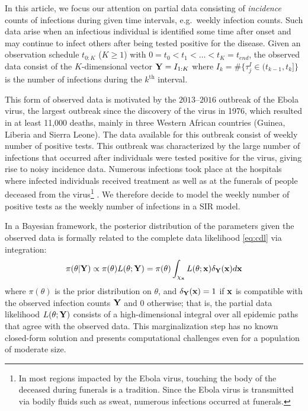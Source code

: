 \documentclass[11pt]{article}
\begin{document}
	In this article, we focus our attention on partial data consisting of \textit{incidence} counts of infections during given time intervals, e.g.\ weekly infection counts. Such data arise when an infectious individual is identified some time after onset and may continue to infect others after being tested positive for the disease. Given an observation schedule $t_{0:K}$ ($K \ge 1$) with $0 = t_0 < t_1 < \dots < t_K = t_{end}$, the observed data consist of the $K$-dimensional vector $\mathbf{Y} = I_{1:K}$ where $I_k = \#\{\tau^I_j \in (t_{k-1}, t_k]\}$ is the number of infections during the $k^{\text{th}}$ interval.
	
	This form of observed data is motivated by the $2013$–$2016$ outbreak of the Ebola virus, the largest outbreak since the discovery of the virus in 1976, which resulted in at least 11,000 deaths, mainly in three Western African countries (Guinea, Liberia and Sierra Leone). The data available for this outbreak consist of weekly number of positive tests. This outbreak was characterized by the large number of infections that occurred after individuals were tested positive for the virus, giving rise to noisy incidence data. Numerous infections took place at the hospitals where infected individuals received treatment as well as at the funerals of people deceased from the virus\footnote{In most regions impacted by the Ebola virus, touching the body of the deceased during funerals is a tradition. Since the Ebola virus is transmitted via bodily fluids such as sweat, numerous infections occurred at funerals.} \cite{Coltart.2017}. We therefore decide to model the weekly number of positive tests as the weekly number of infections in a SIR model.
	
	
	In a Bayesian framework, the posterior distribution of the parameters given the observed data is formally related to the complete data likelihood \eqref{eq:cdl} via integration:
	\begin{equation}
		\label{eq:pdl}
		\pi(\theta|\mathbf{Y}) 
		\propto \pi(\theta) L(\theta; \mathbf{Y}) = \pi(\theta) \int_{\chi_{\mathbf{x}}} L(\theta; \mathbf{x}) \delta_{\mathbf{Y}}(\mathbf{x}) d\mathbf{x}
	\end{equation}
	where $\pi(\theta)$ is the prior distribution on $\theta$, and
	$\delta_{\mathbf{Y}}(\mathbf{x}) = 1$ if $\mathbf{x}$ is compatible with the observed infection counts $\mathbf{Y}$ and $0$ otherwise; that is, the partial data likelihood $L(\theta; \mathbf{Y})$ consists of a high-dimensional integral over all epidemic paths that agree with the observed data. This marginalization step has no known closed-form solution and presents computational challenges even for a population of moderate size.
	
\end{document}
